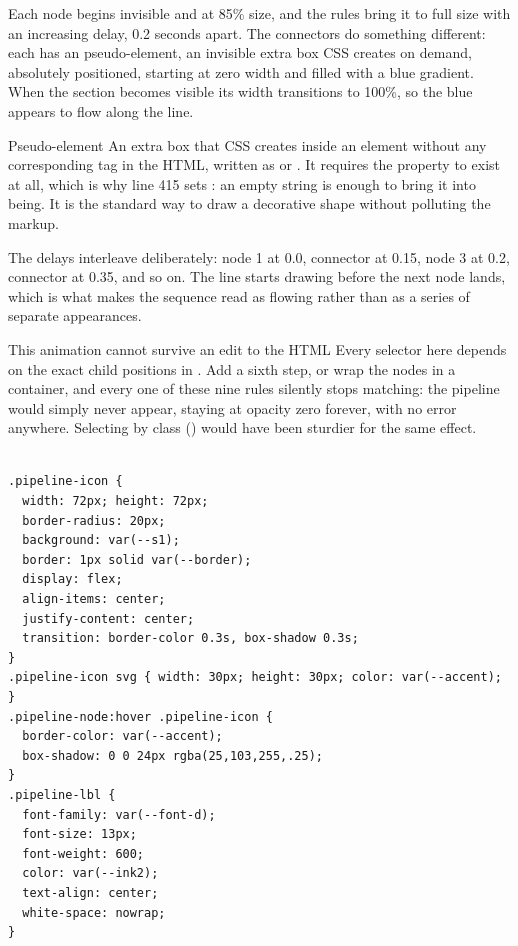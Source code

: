 Each node begins invisible and at 85\% size, and the  rules bring it
to full size with an increasing delay, 0.2 seconds apart. The connectors do
something different: each has an  pseudo-element, an invisible extra
box CSS creates on demand, absolutely positioned, starting at zero width and
filled with a blue gradient. When the section becomes visible its width transitions
to 100\%, so the blue appears to flow along the line.

\begin{jargon}{Pseudo-element}
An extra box that CSS creates inside an element without any corresponding tag in
the HTML, written as  or . It requires the
 property to exist at all, which is why line 415 sets
: an empty string is enough to bring it into being. It is the
standard way to draw a decorative shape without polluting the markup.
\end{jargon}

The delays interleave deliberately: node 1 at 0.0, connector at 0.15, node 3 at
0.2, connector at 0.35, and so on. The line starts drawing before the next node
lands, which is what makes the sequence read as flowing rather than as a series of
separate appearances.

\begin{honest}{This animation cannot survive an edit to the HTML}
Every selector here depends on the exact child positions in . Add
a sixth step, or wrap the nodes in a container, and every one of these nine rules
silently stops matching: the pipeline would simply never appear, staying at opacity
zero forever, with no error anywhere. Selecting by class
() would have been sturdier for the same
effect.
\end{honest}

\begin{lstlisting}[firstnumber=427,caption={\file{css/site.css}, lines 427--450}]

.pipeline-icon {
  width: 72px; height: 72px;
  border-radius: 20px;
  background: var(--s1);
  border: 1px solid var(--border);
  display: flex;
  align-items: center;
  justify-content: center;
  transition: border-color 0.3s, box-shadow 0.3s;
}
.pipeline-icon svg { width: 30px; height: 30px; color: var(--accent); }
.pipeline-node:hover .pipeline-icon {
  border-color: var(--accent);
  box-shadow: 0 0 24px rgba(25,103,255,.25);
}
.pipeline-lbl {
  font-family: var(--font-d);
  font-size: 13px;
  font-weight: 600;
  color: var(--ink2);
  text-align: center;
  white-space: nowrap;
}
\end{lstlisting}

